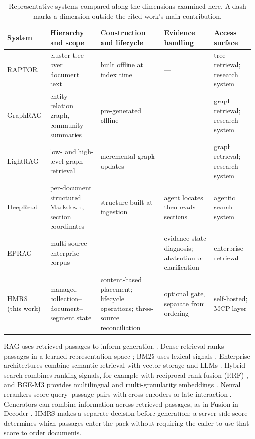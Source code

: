 \begin{table}[!t]
\centering
\small
\setlength{\tabcolsep}{3.5pt}
\renewcommand{\arraystretch}{1.02}
\caption{ Representative systems compared along the dimensions examined here.
A dash marks a dimension outside the cited work's main contribution.}
\label{tab:related-comparison}
\begin{tabular}{@{}>{\raggedright\arraybackslash}p{}>{\raggedright\arraybackslash}p{}>{\raggedright\arraybackslash}p{}>{\raggedright\arraybackslash}p{}>{\raggedright\arraybackslash}p{}@{}}
\toprule
System & Hierarchy and scope & Construction and lifecycle & Evidence handling & Access surface\\
\midrule
RAPTOR \citep{raptor} & cluster tree over document text & built offline at index time & --- & tree retrieval; research system\\
GraphRAG \citep{graphrag} & entity--relation graph, community summaries & pre-generated offline & --- & graph retrieval; research system\\
LightRAG \citep{lightrag} & low- and high-level graph retrieval & incremental graph updates & --- & graph retrieval; research system\\
DeepRead \citep{deepread} & per-document structured Markdown, section coordinates & structure built at ingestion & agent locates then reads sections & agentic search system\\
EPRAG \citep{kinalioglu-kbs-eprag-2026} & multi-source enterprise corpus & --- & evidence-state diagnosis; abstention or clarification & enterprise retrieval\\
HMRS (this work) & managed collection--document--segment state & content-based placement; lifecycle operations; three-source reconciliation & optional gate, separate from ordering & self-hosted; MCP layer\\
\bottomrule
\end{tabular}
\end{table}

RAG uses retrieved passages to inform generation
\citep{rag-lewis,gao-rag-survey-2023}. Dense
retrieval ranks passages in a learned representation space \citep{dpr}; BM25
uses lexical signals \citep{bm25}. Enterprise architectures combine semantic
retrieval with vector storage and LLMs \citep{ghali-kbs-retrieval-2025}.
Hybrid search combines ranking signals, for example with reciprocal-rank
fusion (RRF) \citep{rrf-cormack}, and BGE-M3 provides multilingual and
multi-granularity embeddings \citep{bge-m3}. Neural rerankers score
query--passage pairs with cross-encoders \citep{nogueira-monobert-2019} or
late interaction \citep{khattab-colbert-2020}. Generators can combine
information across retrieved passages, as in Fusion-in-Decoder
\citep{izacard-grave}. HMRS makes a separate decision before generation:
a server-side score determines which passages enter the pack without
requiring the caller to use that score to order documents.


